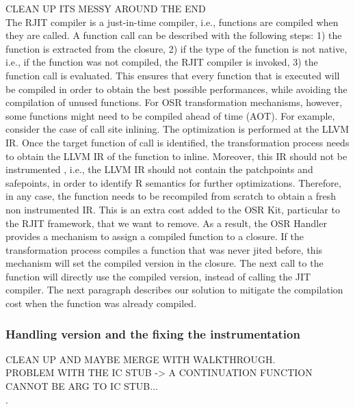 CLEAN UP ITS MESSY AROUND THE END\\

The RJIT compiler is a just-in-time compiler, i.e., functions are compiled when they are called.
A function call can be described with the following steps: 1) the function is extracted from the closure, 2) if the type of the function is not native, i.e., if the function was not compiled, the RJIT compiler is invoked, 3) the function call is evaluated.
This ensures that every function that is executed will be compiled in order to obtain the best possible performances, while avoiding the compilation of unused functions.
For OSR transformation mechanisms, however, some functions might need to be compiled ahead of time (AOT).
For example, consider the case of call site inlining.
The optimization is performed at the LLVM IR.
Once the target function of call is identified, the transformation process needs to obtain the LLVM IR of the function to inline.
Moreover, this IR should not be instrumented , i.e., the LLVM IR should not contain the patchpoints and safepoints, in order to identify R semantics for further optimizations.
Therefore, in any case, the function needs to be recompiled from scratch to obtain a fresh non instrumented IR. 
This is an extra cost added to the OSR Kit, particular to the RJIT framework, that we want to remove.
As a result, the OSR Handler provides a mechanism to assign a compiled function to a closure. 
If the transformation process compiles a function that was never jited before, this mechanism will set the compiled version in the closure.
The next call to the function will directly use the compiled version, instead of calling the JIT compiler.
The next paragraph describes our solution to mitigate the compilation cost when the function was already compiled.\\


\subsubsection{Handling version and the fixing the instrumentation}
CLEAN UP AND MAYBE MERGE WITH WALKTHROUGH.\\
PROBLEM WITH THE IC STUB -> A CONTINUATION FUNCTION CANNOT BE ARG TO IC STUB...\\.

